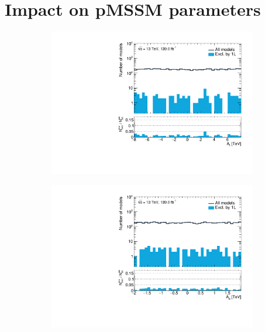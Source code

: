 \section{Impact on pMSSM parameters}

\begin{figure}
	\centering
	\begin{subfigure}[b]{0.4\linewidth}
		\centering\includegraphics[width=\textwidth]{1D/At}
	\end{subfigure}
	\begin{subfigure}[b]{0.4\linewidth}
		\centering\includegraphics[width=\textwidth]{1D/Ab}
	\end{subfigure}
	\begin{subfigure}[b]{0.4\linewidth}

\end{subfigure}
\end{figure}
